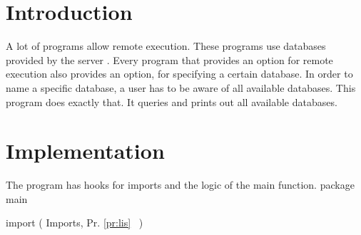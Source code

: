 \nwfilename{}\nwenddocs{}\nwdocspar%
\section*{Introduction}
A lot of  programs allow remote execution. These programs
use databases provided by the  server . Every program
that provides an option for remote execution also provides an option, for 
specifying a certain database. In order to name a specific database, a user
has to be aware of all available databases. This program does exactly that.
It queries  and prints out all available databases.

\section*{Implementation}
The program  has hooks for imports and the logic of the main
function.
\nwenddocs{}\endmoddef\nwstartdeflinemarkup\nwenddeflinemarkup
package main

import (
          \LA{}Imports, Pr. \ref{pr:lis}~{\nwtagstyle{}}\RA{}
)


